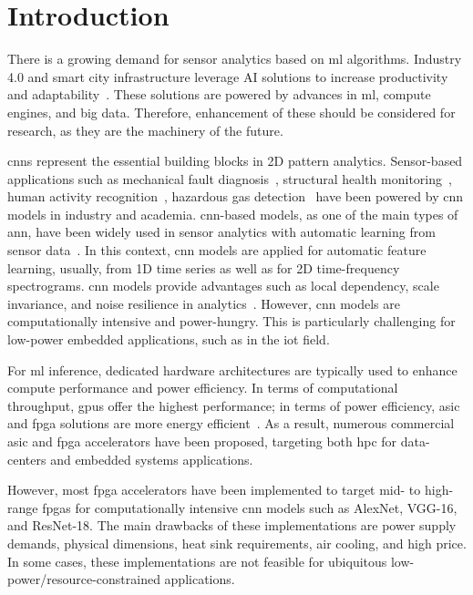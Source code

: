 
\section{Introduction}
\label{sec:introduction}
There is a growing demand for sensor analytics based on \gls{ml} algorithms. Industry 4.0 and smart city infrastructure leverage AI solutions to increase productivity and adaptability~\cite{lom2016industry}. These solutions are powered by advances in \gls{ml}, compute engines, and big data. Therefore, enhancement of these should be considered for research, as they are the machinery of the future.

\glspl{cnn} represent the essential building blocks in 2D pattern analytics. Sensor-based applications such as mechanical fault diagnosis~\cite{li2019sensor,dong2018rolling}, structural health monitoring~\cite{nagayama2007structural}, human activity recognition~\cite{wang2019deep}, hazardous gas detection~\cite{kim2017hazardous} have been powered by \gls{cnn} models in industry and academia. \gls{cnn}-based models, as one of the main types of \gls{ann}, have been widely used in sensor analytics with automatic learning from sensor data~\cite{ince2016real, janssens2016convolutional, abdeljaber2017real, guo2016hierarchical}. In this context, \gls{cnn} models are applied for automatic feature learning, usually, from 1D time series as well as for 2D time-frequency spectrograms. \gls{cnn} models provide advantages such as local dependency, scale invariance, and noise resilience in analytics~\cite{du2014leveraging}. However, \gls{cnn} models are computationally intensive and power-hungry. This is particularly challenging for low-power embedded applications, such as in the \gls{iot} field.

For \gls{ml} inference, dedicated hardware architectures are typically used to enhance compute performance and power efficiency. In terms of computational throughput, \glspl{gpu} offer the highest performance; in terms of power efficiency, \gls{asic} and \gls{fpga} solutions are more energy efficient~\cite{nurvitadhi2017can}. As a result, numerous commercial \gls{asic} and \gls{fpga} accelerators have been proposed, targeting both \gls{hpc} for data-centers and embedded systems applications.

However, most \gls{fpga} accelerators have been implemented to target mid- to high-range \glspl{fpga} for computationally intensive \gls{cnn} models such as AlexNet, VGG-16, and ResNet-18. The main drawbacks of these implementations are power supply demands, physical dimensions, heat sink requirements, air cooling, and high price. In some cases, these implementations are not feasible for ubiquitous low-power/resource-constrained applications.

